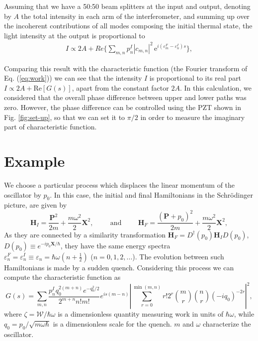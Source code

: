 \documentclass[a0,portrait]{a0poster}
\begin{document}
\begin{multicols}{2}
Assuming that we have a 50:50 beam splitters at the input and output, denoting by $A$ the total intensity in each arm of the interferometer, and summing up over the incoherent contributions of all modes composing the initial thermal state, the light intensity at the output is proportional to
\begin{eqnarray}
I \propto 2A + Re \biggr\{  \sum_{m,n}p_{n}^{I}  |c_{m,n}|^2 \, \mbox{e}^{i(\varepsilon_{m}^{F}-\varepsilon_{n}^{I})s}\biggr\},
\label{c5}
\end{eqnarray}

Comparing this result with the characteristic function (the Fourier transform of Eq. (\ref{eq:work})) we can see that the intensity $I$ is proportional to its real part $I \propto 2A + \mbox{Re}\left[G(s)\right]$, apart from the constant factor $2A$. In this calculation, we considered that the overall phase difference between upper and lower paths was zero. However, the phase difference can be controlled using the PZT shown in Fig. \ref{fig:set-up}, so that we can set it to $\pi/2$ in order to measure the imaginary part of characteristic function. 

\section*{Example}

We choose a particular process which displaces the linear momentum of the oscillator by $p_{0}$. In this case, the initial and final Hamiltonians in the Schr\"{o}dinger picture, are given by
\begin{equation}
\mathbf{H}_{I} = \frac{\mathbf{P}^{2}}{2m} + \frac{m\omega^{2}}{2}\mathbf{X}^{2}, \hspace{1cm} \mbox{and} \hspace{1cm}  \mathbf{H}_{F} = \frac{\left( \mathbf{P} + p_{0} \right)^{2}}{2m} + \frac{m\omega^{2}}{2}\mathbf{X}^{2},
\label{hamil}
\end{equation}
As they are connected by a similarity transformation $\mathbf{H}_{F} = D^{\dagger}(p_{0}) \mathbf{H}_{I}D(p_{0})$, $D(p_{0}) \equiv e^{-ip_{0}\mathbf{X}/\hbar}$, they have the same energy spectra $\varepsilon^{F}_{n} =\varepsilon^{I}_{n} \equiv \varepsilon_{n} = \hbar\omega\left(n + \frac{1}{2}\right)$ ($n = 0, 1, 2, ...$). The evolution between such Hamiltonians is made by a sudden quench. Considering this process we can compute the characteristic function as
\begin{equation}
G\left(s\right) = \sum_{m,n}\frac{p_{n}^{I}q_{0}^{2(m+n)}e^{-q_{0}^{2}/2}}{2^{m+n}n!m!}e^{is(m - n)}\left\vert\sum_{r=0}^{\min(m,n)}r!2^{r}\binom{m}{r}\binom{n}{r}(-iq_{0})^{-2r}\right\vert^{2},
\label{eq:char_f}
\end{equation}
where $\zeta = \mathcal{W}/\hbar\omega$ is a dimensionless quantity measuring work in units of $\hbar\omega$, while $q_{0}=p_{0}/\sqrt{m\omega\hbar}$ is a dimensionless scale for the quench. $m$ and $\omega$ characterize the oscillator.


\end{multicols}
\end{document}
